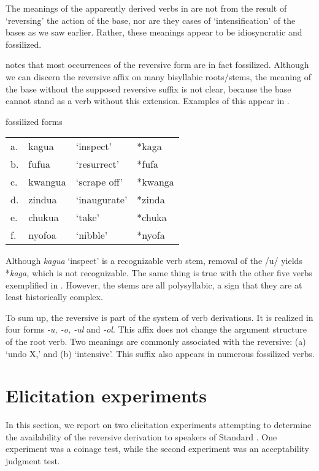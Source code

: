 \documentclass[output=paper]{langsci/langscibook}
\begin{document}
The meanings of the apparently derived verbs in  are not from the result of ‘reversing’ the action of the base, nor are they cases of ‘intensification’ of the bases as we saw earlier. Rather, these meanings appear to be idiosyncratic and fossilized.

\citet[103]{Shepardson1986} notes that most occurrences of the reversive form are in fact fossilized. Although we can discern the reversive affix on many bisyllabic roots/stems, the meaning of the base without the supposed reversive suffix is not clear, because the base cannot stand as a verb without this extension.  Examples of this appear in .

\ea\label{ex:ngonyaningowa:10} {fossilized forms}
\begin{tabularx}{\textwidth}{llll}
a.\label{ex:ngonyaningowa:10a} & {kagua} & {‘inspect’} & {*kaga} \\
b.\label{ex:ngonyaningowa:10b}& {fufua}  & {‘resurrect’} & {*fufa}\\
c.\label{ex:ngonyaningowa:10c} & {kwangua} & {‘scrape off’} & {*kwanga} \\
d.\label{ex:ngonyaningowa:10d} & {zindua} & {‘inaugurate’} & {*zinda} \\
e.\label{ex:ngonyaningowa:10e}& {chukua}  & {‘take’} & {*chuka}\\
f.\label{ex:ngonyaningowa:10f} & {nyofoa} & {‘nibble’} & {*nyofa} 
\end{tabularx}
\z

Although \textit{kagua} ‘inspect’ is a recognizable verb stem, removal of the /u/ yields *\textit{kaga,} which is not recognizable. The same thing is true with the other five verbs exemplified in . However, the stems are all polysyllabic, a sign that they are at least historically complex.

To sum up, the reversive is part of the system of  verb derivations. It is realized in four forms \textit{-u, -o, -ul} and \textit{-ol}. This affix does not change the argument structure of the root verb. Two meanings are commonly associated with the reversive: (a) ‘undo X,’ and (b) ‘intensive’. This suffix also appears in numerous fossilized verbs.

\section{Elicitation experiments}\label{sec:ngonyaningowa:4}

In this section, we report on two elicitation experiments attempting to determine the availability of the reversive derivation to speakers of Standard . One experiment was a coinage test, while the second experiment was an acceptability judgment test. 
\end{document}
